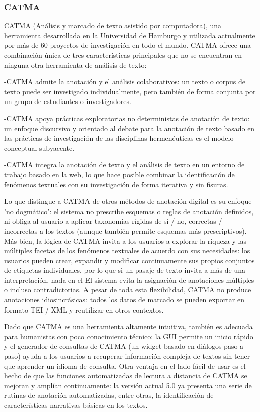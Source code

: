 \subsubsection*{CATMA}

CATMA (Análisis y marcado de texto asistido por computadora), una herramienta desarrollada en la Universidad de Hamburgo y utilizada actualmente por más de 60 proyectos de investigación en todo el mundo. CATMA ofrece una combinación única de tres características principales que no se encuentran en ninguna otra herramienta de análisis de texto:

-CATMA admite la anotación y el análisis colaborativos: un texto o corpus de texto puede ser investigado individualmente, pero también de forma conjunta por un grupo de estudiantes o investigadores.

-CATMA apoya prácticas exploratorias no deterministas de anotación de texto: un enfoque discursivo y orientado al debate para la anotación de texto basado en las prácticas de investigación de las disciplinas hermenéuticas es el modelo conceptual subyacente.

-CATMA integra la anotación de texto y el análisis de texto en un entorno de trabajo basado en la web, lo que hace posible combinar la identificación de fenómenos textuales con su investigación de forma iterativa y sin fisuras.

Lo que distingue a CATMA de otros métodos de anotación digital es su enfoque 'no dogmático': el sistema no prescribe esquemas o reglas de anotación definidos, ni obliga al usuario a aplicar taxonomías rígidas de sí / no, correctas / incorrectas a los textos (aunque también permite esquemas más prescriptivos). Más bien, la lógica de CATMA invita a los usuarios a explorar la riqueza y las múltiples facetas de los fenómenos textuales de acuerdo con sus necesidades: los usuarios pueden crear, expandir y modificar continuamente sus propios conjuntos de etiquetas individuales, por lo que si un pasaje de texto invita a más de una interpretación, nada en el El sistema evita la asignación de anotaciones múltiples o incluso contradictorias. A pesar de toda esta flexibilidad, CATMA no produce anotaciones idiosincrásicas: todos los datos de marcado se pueden exportar en formato TEI / XML y reutilizar en otros contextos.

Dado que CATMA es una herramienta altamente intuitiva, también es adecuada para humanistas con poco conocimiento técnico: la GUI permite un inicio rápido y el generador de consultas de CATMA (un widget basado en diálogos paso a paso) ayuda a los usuarios a recuperar información compleja de textos sin tener que aprender un idioma de consulta. Otra ventaja en el lado fácil de usar es el hecho de que las funciones automatizadas de lectura a distancia de CATMA se mejoran y amplían continuamente: la versión actual 5.0 ya presenta una serie de rutinas de anotación automatizadas, entre otras, la identificación de características narrativas básicas en los textos.

